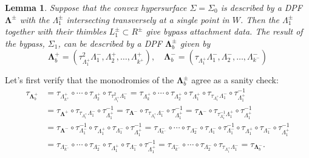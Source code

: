 \documentclass[11pt]{amsart}
\newcommand{\thicc}[1]{\pmb{#1}}
\newcommand{\Leg}{\Lambda}
\newcommand{\posNegRegion}{R^{\pm}}
\newcommand{\Lag}{L}
\newcommand{\posNegLag}{\Lag^{\pm}}
\newcommand{\posLeg}{\Leg^{+}}
\newcommand{\negLeg}{\Leg^{-}}
\newcommand{\thiccPosLeg}{\thicc{\Leg}^{+}}
\newcommand{\thiccNegLeg}{\thicc{\Leg}^{-}}
\newcommand{\thiccPosNegLeg}{\thicc{\Leg}^{\pm}}
\newcommand{\posNegLeg}{\Leg^{\pm}}
\newtheorem{lemma}[thm]{Lemma}
\begin{document}
\begin{lemma}\label{Lemma:OBBypass}
Suppose that the convex hypersurface $\Sigma = \Sigma_{0}$ is described by a DPF $\thiccPosNegLeg$ with the $\posNegLeg_{1}$ intersecting transversely at a single point in $W$. Then the $\posNegLeg_{1}$ together with their thimbles $\posNegLag_{1} \subset \posNegRegion$ give bypass attachment data. The result of the bypass, $\Sigma_{1}$, can be described by a DPF $\thiccPosNegLeg_{b}$ given by
\begin{equation*}
\thiccPosLeg_{b} = (\tau_{\posLeg_{1}}^{2}\negLeg_{1}, \posLeg_{2}, \dots, \posLeg_{k^{+}}), \quad \thiccNegLeg_{b} = (\tau_{\posLeg_{1}}\negLeg_{1}, \negLeg_{2}, \dots, \negLeg_{k^{-}})
\end{equation*}
\end{lemma}

Let's first verify that the monodromies of the $\thiccPosNegLeg_{b}$ agree as a sanity check:
\begin{equation*}
\begin{aligned}
\tau_{\thiccPosLeg_{b}} &= \tau_{\posLeg_{k^{+}}} \circ \cdots \circ \tau_{\posLeg_{2}} \circ \tau_{\tau_{\posLeg_{1}}^{2}\negLeg_{1}} = \tau_{\posLeg_{k}} \circ \cdots \circ \tau_{\posLeg_{2}} \circ \tau_{\posLeg_{1}} \circ \tau_{\tau_{\posLeg_{1}}\negLeg_{1}} \circ \tau_{\posLeg_{1}}^{-1} \\
&=  \tau_{\thiccPosLeg} \circ \tau_{\tau_{\posLeg_{1}}\negLeg_{1}} \circ \tau_{\posLeg_{1}}^{-1} = \tau_{\thiccNegLeg} \circ \tau_{\tau_{\posLeg_{1}}\negLeg_{1}} \circ \tau_{\posLeg_{1}}^{-1}  = \tau_{\thiccNegLeg} \circ \tau_{\tau_{\negLeg_{1}}^{-1}\posLeg_{1}} \circ \tau_{\posLeg_{1}}^{-1}\\
&= \tau_{\thiccNegLeg} \circ \tau_{\negLeg_{1}}^{-1}\circ \tau_{\posLeg_{1}}\circ \tau_{\negLeg_{1}} \circ \tau_{\posLeg_{1}}^{-1} = \tau_{\negLeg_{k^{-}}}\circ \cdots \circ \tau_{\negLeg_{2}} \circ \tau_{\negLeg_{1}} \circ \tau_{\negLeg_{1}}^{-1}\circ \tau_{\posLeg_{1}}\circ \tau_{\negLeg_{1}} \circ \tau_{\posLeg_{1}}^{-1}\\
&= \tau_{\negLeg_{k^{-}}}\circ \cdots \circ \tau_{\negLeg_{2}} \circ \tau_{\posLeg_{1}}\circ \tau_{\negLeg_{1}} \circ \tau_{\posLeg_{1}}^{-1} = \tau_{\negLeg_{k^{-}}}\circ \cdots \circ \tau_{\negLeg_{2}} \circ \tau_{\tau_{\posLeg_{1}}\negLeg_{1}} = \tau_{\thiccNegLeg_{b}}.
\end{aligned}
\end{equation*}
\end{document}

